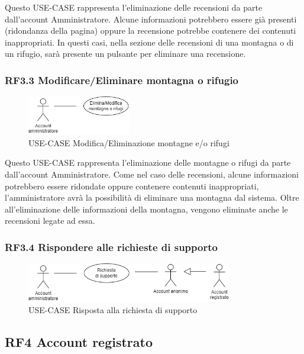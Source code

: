 \documentclass[a4paper,12pt]{article}
\begin{document}
Questo USE-CASE rappresenta l'eliminazione delle recensioni da parte dall'account Amministratore.
Alcune informazioni potrebbero essere già presenti (ridondanza della pagina) oppure la recensione potrebbe contenere dei contenuti inappropriati. 
In questi casi, nella sezione delle recensioni di una montagna o di un rifugio, sarà presente un pulsante per eliminare una recensione.

\subsubsection*{RF3.3 Modificare/Eliminare montagna o rifugio}
\begin{figure}[H]
   \centering
   \includegraphics[width=0.4\textwidth]{img-D2/m_e_montagna_rifugio.png}
    \caption{USE-CASE Modifica/Eliminazione montagne e/o rifugi}
\end{figure}

Questo USE-CASE rappresenta l'eliminazione delle montagne o rifugi da parte dall'account Amministratore.
Come nel caso delle recensioni, alcune informazioni potrebbero essere ridondate oppure contenere contenuti inappropriati, l'amministratore avrà la possibilità di eliminare una montagna dal sistema.
Oltre all'eliminazione delle informazioni della montagna, vengono eliminate anche le recensioni legate ad essa. 

\subsubsection*{RF3.4 Rispondere alle richieste di supporto}

\begin{figure}[H]
   \centering
   \includegraphics[width=0.8\textwidth]{img-D2/richiesta_supporto_amministratore.png}
    \caption{USE-CASE Risposta alla richiesta di supporto}
\end{figure}


\subsection*{RF4 Account registrato}
\end{document}
